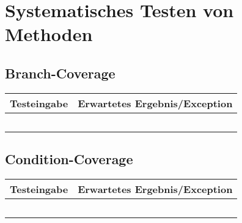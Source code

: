 \chapter{Systematisches Testen von Methoden}
\section{Branch-Coverage}
\begin{center}
	\begin{tabular}{ c c }
		\hline
		Testeingabe & Erwartetes Ergebnis/Exception \\
		\hline 
		&    \\  
		&    \\   
		&    \\
		&    \\
		&   
	\end{tabular}
\end{center}


\section{Condition-Coverage}
\begin{center}
	\begin{tabular}{ c c }
		\hline
		Testeingabe & Erwartetes Ergebnis/Exception \\
		\hline 
		&    \\  
		&    \\   
		&    \\
		&    \\
		&   
	\end{tabular}
\end{center}